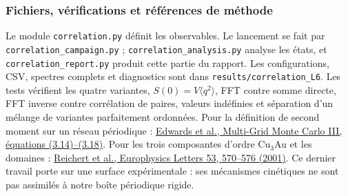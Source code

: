 \subsubsection{Fichiers, vérifications et références de méthode}
Le module \texttt{correlation.py} définit les observables. Le lancement se fait par \texttt{correlation\_campaign.py} ; \texttt{correlation\_analysis.py} analyse les états, et \texttt{correlation\_report.py} produit cette partie du rapport. Les configurations, CSV, spectres complets et diagnostics sont dans \texttt{results/correlation\_L6}. Les tests vérifient les quatre variantes, $S(0)=V\langle q^2\rangle$, FFT contre somme directe, FFT inverse contre corrélation de paires, valeurs indéfinies et séparation d'un mélange de variantes parfaitement ordonnées.
Pour la définition de second moment sur un réseau périodique : \href{https://arxiv.org/abs/hep-lat/9112002}{Edwards et al., Multi-Grid Monte Carlo III, équations (3.14)--(3.18)}. Pour les trois composantes d'ordre Cu$_3$Au et les domaines : \href{https://www.homepages.ucl.ac.uk/~ucapikr/harald3.pdf}{Reichert et al., Europhysics Letters 53, 570--576 (2001)}. Ce dernier travail porte sur une surface expérimentale : ses mécanismes cinétiques ne sont pas assimilés à notre boîte périodique rigide.
